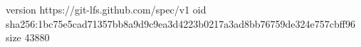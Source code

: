 version https://git-lfs.github.com/spec/v1
oid sha256:1bc75e5cad71357bb8a9d9c9ea3d4223b0217a3ad8bb76759de324e757cbff96
size 43880
